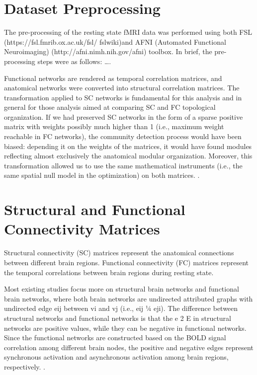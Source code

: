 
\section{Dataset Preprocessing}

The pre-processing of the resting state fMRI data was
performed using both FSL (https://fsl.fmrib.ox.ac.uk/fsl/
fslwiki)and AFNI (Automated Functional Neuroimaging) (http://afni.nimh.nih.gov/afni) toolbox. 
In brief, the pre-processing steps were as follows: \dots \cite{Zhang2022}.

Functional networks are rendered as temporal correlation matrices, and anatomical networks were converted into structural 
correlation matrices.
The transformation applied to SC networks is fundamental for this analysis and in general for those analysis aimed at 
comparing SC and FC topological organization. 
If we had preserved SC networks in the form of a sparse positive matrix with
weights possibly much higher than 1 (i.e., maximum weight reachable in FC networks), the community detection process would  
have been biased: depending it on the weights of the matrices, it would have found modules reflecting almost exclusively 
the anatomical modular organization.
Moreover, this transformation allowed us to use the same mathematical instruments (i.e., the same spatial null model in 
the optimization) on both matrices.
\cite{Puxeddu2022}.

\section{Structural and Functional Connectivity Matrices}
Structural connectivity (SC) matrices represent the anatomical connections between different brain regions.
Functional connectivity (FC) matrices represent the temporal correlations between brain regions during resting state.

Most existing studies focus more on structural brain networks 
and functional brain networks, where both brain networks are 
undirected attributed graphs with undirected edge eij between 
vi and vj (i.e., eij ¼ eji). The difference between structural
networks and functional networks is that the e 2 E in structural 
networks are positive values, while they can be negative in 
functional networks.
Since the functional networks are constructed based on the BOLD 
signal correlation among different brain nodes, the positive and 
negative edges represent synchronous activation and asynchronous 
activation among brain regions, respectively. \cite{Tang2023}.


